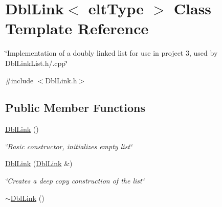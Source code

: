 \hypertarget{classDblLink}{\section{Dbl\-Link$<$ elt\-Type $>$ Class Template Reference}
\label{classDblLink}
}


\char`\"{}\-Implementation of a doubly linked list for use in project 3, used by Dbl\-Link\-List.\-h/.\-cpp\char`\"{}  




{\ttfamily \#include $<$Dbl\-Link.\-h$>$}

\subsection*{Public Member Functions}
\begin{DoxyCompactItemize}
\item 
\hypertarget{classDblLink_aa55badb70305cb5f3666ee1a0caf51bd}{\hyperlink{classDblLink_aa55badb70305cb5f3666ee1a0caf51bd}{Dbl\-Link} ()}\label{classDblLink_aa55badb70305cb5f3666ee1a0caf51bd}

\begin{DoxyCompactList}\small\item\em \char`\"{}\-Basic constructor, initializes empty list\char`\"{} \end{DoxyCompactList}\item 
\hyperlink{classDblLink_a6ec142fb189ce28f3470662d7816323c}{Dbl\-Link} (\hyperlink{classDblLink}{Dbl\-Link} \&)
\begin{DoxyCompactList}\small\item\em \char`\"{}\-Creates a deep copy construction of the list\char`\"{} \end{DoxyCompactList}\item 
\hypertarget{classDblLink_af453e027e035c5f35f57884a119111c2}{\hyperlink{classDblLink_af453e027e035c5f35f57884a119111c2}{$\sim$\-Dbl\-Link} ()}\label{classDblLink_af453e027e035c5f35f57884a119111c2}


\end{DoxyCompactItemize}
